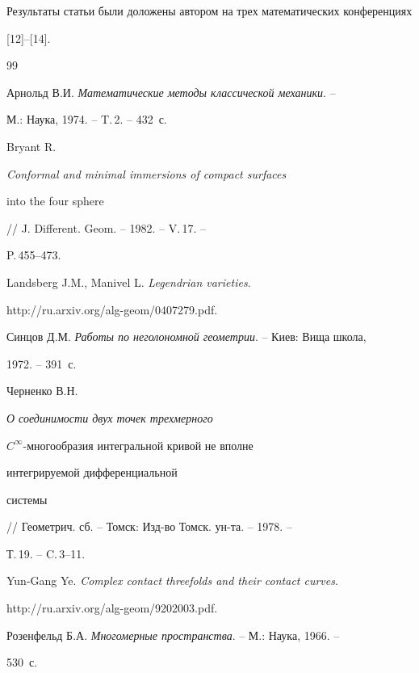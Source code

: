  





Результаты статьи были доложены автором на трех математических конференциях


[12]--[14].








\begin{thebibliography}{99}







Арнольд В.И. {\it Математические методы классической механики}. -- 


М.: Наука, 1974. -- T.\,2. -- 432~с.




Bryant R. {\it Conformal and minimal immersions of compact surfaces 


into the four sphere} // J. Different. Geom. -- 1982. -- V.\,17. --


P.\,455--473. 




Landsberg J.M., Manivel L. {\it Legendrian varieties}.


http://ru.arxiv.org/alg-geom/0407279.pdf.




Синцов Д.М. {\it Работы по неголономной геометрии}. -- Киев: Вища школа,


1972. -- 391~с.




Черненко В.Н. {\it О соединимости двух точек трехмерного 


$C^{\infty}$-многообразия интегральной кривой не вполне


интегрируемой дифференциальной 


системы} // Геометрич. сб. -- Томск: Изд-во Томск. ун-та. -- 1978. --


Т.\,19. -- C.\,3--11.




Yun-Gang Ye. {\it Complex contact threefolds and their contact curves}.


http://ru.arxiv.org/alg-geom/9202003.pdf.




Розенфельд Б.А. {\it Многомерные пространства}. -- М.: Наука, 1966. --


530~с.



\end{thebibliography}

